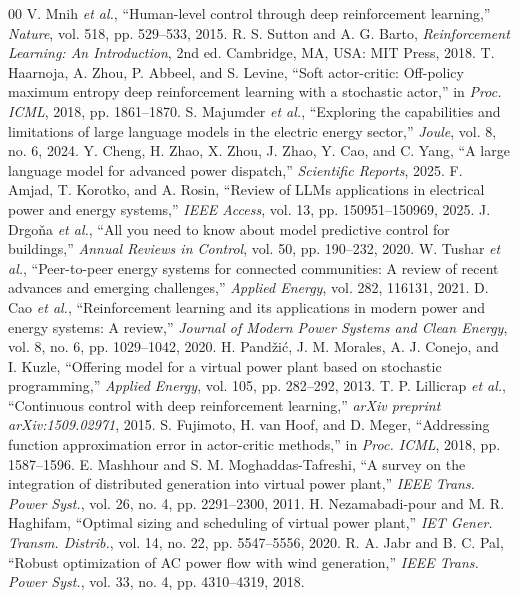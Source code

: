 \documentclass{ieeeaccess}
\begin{document}
\begin{thebibliography}{00}
 V. Mnih \emph{et al.}, ``Human-level control through deep reinforcement learning,'' \emph{Nature}, vol. 518, pp. 529--533, 2015.
 R. S. Sutton and A. G. Barto, \emph{Reinforcement Learning: An Introduction}, 2nd ed. Cambridge, MA, USA: MIT Press, 2018.
 T. Haarnoja, A. Zhou, P. Abbeel, and S. Levine, ``Soft actor-critic: Off-policy maximum entropy deep reinforcement learning with a stochastic actor,'' in \emph{Proc. ICML}, 2018, pp. 1861--1870.
 S. Majumder \emph{et al.}, ``Exploring the capabilities and limitations of large language models in the electric energy sector,'' \emph{Joule}, vol. 8, no. 6, 2024.
 Y. Cheng, H. Zhao, X. Zhou, J. Zhao, Y. Cao, and C. Yang, ``A large language model for advanced power dispatch,'' \emph{Scientific Reports}, 2025.
 F. Amjad, T. Korotko, and A. Rosin, ``Review of LLMs applications in electrical power and energy systems,'' \emph{IEEE Access}, vol. 13, pp. 150951--150969, 2025.
 J. Drgo\v{n}a \emph{et al.}, ``All you need to know about model predictive control for buildings,'' \emph{Annual Reviews in Control}, vol. 50, pp. 190--232, 2020.
 W. Tushar \emph{et al.}, ``Peer-to-peer energy systems for connected communities: A review of recent advances and emerging challenges,'' \emph{Applied Energy}, vol. 282, 116131, 2021.
 D. Cao \emph{et al.}, ``Reinforcement learning and its applications in modern power and energy systems: A review,'' \emph{Journal of Modern Power Systems and Clean Energy}, vol. 8, no. 6, pp. 1029--1042, 2020.
 H. Pand\v{z}i\'{c}, J. M. Morales, A. J. Conejo, and I. Kuzle, ``Offering model for a virtual power plant based on stochastic programming,'' \emph{Applied Energy}, vol. 105, pp. 282--292, 2013.
 T. P. Lillicrap \emph{et al.}, ``Continuous control with deep reinforcement learning,'' \emph{arXiv preprint arXiv:1509.02971}, 2015.
 S. Fujimoto, H. van Hoof, and D. Meger, ``Addressing function approximation error in actor-critic methods,'' in \emph{Proc. ICML}, 2018, pp. 1587--1596.
 E. Mashhour and S. M. Moghaddas-Tafreshi, ``A survey on the integration of distributed generation into virtual power plant,'' \emph{IEEE Trans. Power Syst.}, vol. 26, no. 4, pp. 2291--2300, 2011.
 H. Nezamabadi-pour and M. R. Haghifam, ``Optimal sizing and scheduling of virtual power plant,'' \emph{IET Gener. Transm. Distrib.}, vol. 14, no. 22, pp. 5547--5556, 2020.
 R. A. Jabr and B. C. Pal, ``Robust optimization of AC power flow with wind generation,'' \emph{IEEE Trans. Power Syst.}, vol. 33, no. 4, pp. 4310--4319, 2018.

\end{thebibliography}
\end{document}
